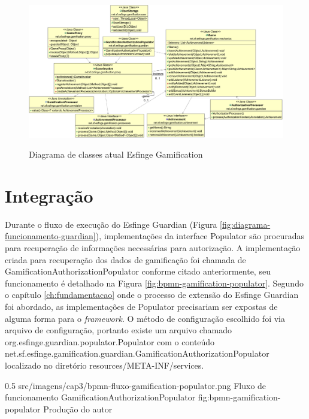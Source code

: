 \begin{landscape}
    \begin{figure}    \caption{Diagrama de classes atual Esfinge Gamification}
    \includegraphics[scale=0.42]{src/imagens/cap3/gamification-class-diagram-cap3.png}
    \label{fig:gamification-diagrama-classe-cap3}
    \end{figure}
\end{landscape}

\section{Integração}

\par Durante o fluxo de execução do Esfinge Guardian (Figura \ref{fig:diagrama-funcionamento-guardian}), implementações da interface Populator são procuradas para recuperação de informações necessárias para autorização. A implementação criada para recuperação dos dados de gamificação foi chamada de GamificationAuthorizationPopulator conforme citado anteriormente, seu funcionamento é detalhado na Figura \ref{fig:bpmn-gamification-populator}. Segundo o capítulo \ref{ch:fundamentacao} onde o processo de extensão do Esfinge Guardian foi abordado, as implementações de Populator precisariam ser expostas de alguma forma para o \textit{framework}. O método de configuração escolhido foi via arquivo de configuração, portanto existe um arquivo chamado org.esfinge.guardian.populator.Populator com o conteúdo net.sf.esfinge.gamification.guardian.GamificationAuthorizationPopulator localizado no diretório resources/META-INF/services.

\begin{image}
{0.5}
{src/imagens/cap3/bpmn-fluxo-gamification-populator.png}
{Fluxo de funcionamento GamificationAuthorizationPopulator}
{fig:bpmn-gamification-populator}
{Produção do autor}
\end{image}

